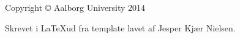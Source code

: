\thispagestyle{empty}
{\small
\strut\vfill %
\noindent Copyright \copyright{} Aalborg University 2014\par
\vspace{0.2cm}
\noindent Skrevet i \LaTeX ud fra template lavet af Jesper Kjær Nielsen. 
}
\clearpage

